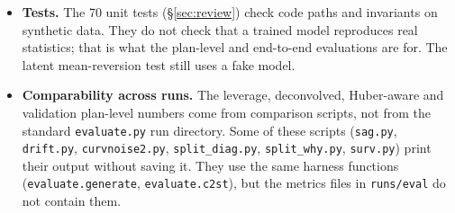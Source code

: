 \documentclass[11pt,a4paper]{article}
\newcommand{\U}{\ensuremath{U}}
\begin{document}
\begin{itemize}
  first line could rise about 1--1.4\,\U\ into the top margin, and ink could
  pass the bottom margin. The guard (\S\ref{sec:margin}) fixes this, and a
  test that fails on the old code now covers it. It reserves only
  $0.3\,\U$ for the wobble, so an extreme word can still cross a margin by a
  little; the test allows $0.5\,\U$.
\item \textbf{Tests.} The 70 unit tests (\S\ref{sec:review}) check
  code paths and invariants on synthetic data. They do not check that a
  trained model reproduces real statistics; that is what the plan-level and
  end-to-end evaluations are for. The latent mean-reversion test still uses a
  fake model.
\item \textbf{Comparability across runs.} The leverage, deconvolved, Huber-aware and
  validation plan-level numbers come from comparison scripts, not from the
  standard \texttt{evaluate.py} run directory. Some of these scripts
  (\texttt{sag.py}, \texttt{drift.py}, \texttt{curvnoise2.py},
  \texttt{split\_diag.py}, \texttt{split\_why.py}, \texttt{surv.py}) print
  their output without saving it. They use the same harness functions
  (\texttt{evaluate.generate}, \texttt{evaluate.c2st}), but the metrics files
  in \texttt{runs/eval} do not contain them.
\end{itemize}

\end{document}
